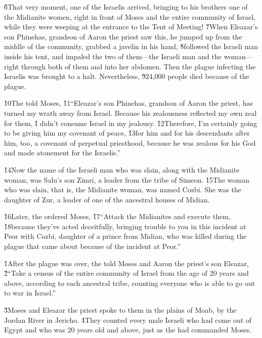 \v{6}That very moment, one of the Israelis arrived, bringing to his brothers one of the Midianite women, right in front of Moses and the entire community of Israel, while they were weeping at the entrance to the Tent of Meeting! \v{7}When Eleazar's son Phinehas, grandson of Aaron the priest saw this, he jumped up from the middle of the community, grabbed a javelin in his hand, \v{8}followed the Israeli man inside his tent, and impaled the two of them---the Israeli man and the woman---right through both of them and into her abdomen. Then the plague infecting the Israelis was brought to a halt. Nevertheless, \v{9}24,000 people died because of the plague.

\v{10}The  told Moses, \v{11}``Eleazar's son Phinehas, grandson of Aaron the priest, has turned my wrath away from Israel. Because his zealousness reflected my own zeal for them, I didn't consume Israel in my jealousy. \v{12}Therefore, I'm certainly going to be giving him my covenant of peace, \v{13}for him and for his descendants after him, too, a covenant of perpetual priesthood, because he was zealous for his God and made atonement for the Israelis.''

\v{14}Now the name of the Israeli man who was slain, along with the Midianite woman, was Salu's son Zimri, a leader from the tribe of Simeon. \v{15}The woman who was slain, that is, the Midianite woman, was named Cozbi. She was the daughter of Zur, a leader of one of the ancestral houses of Midian.

\v{16}Later, the  ordered Moses, \v{17}``Attack the Midianites and execute them, \v{18}because they've acted deceitfully, bringing trouble to you in this incident at Peor with Cozbi, daughter of a prince from Midian, who was killed during the plague that came about because of the incident at Peor.''

\v{1}After the plague was over, the  told Moses and Aaron the priest's son Eleazar, \v{2}``Take a census of the entire community of Israel from the age of 20 years and above, according to each ancestral tribe, counting everyone who is able to go out to war in Israel.''

\v{3}Moses and Eleazar the priest spoke to them in the plains of Moab, by the Jordan River in Jericho. \v{4}They counted every male Israeli who had come out of Egypt and who was 20 years old and above, just as the  had commanded Moses.

